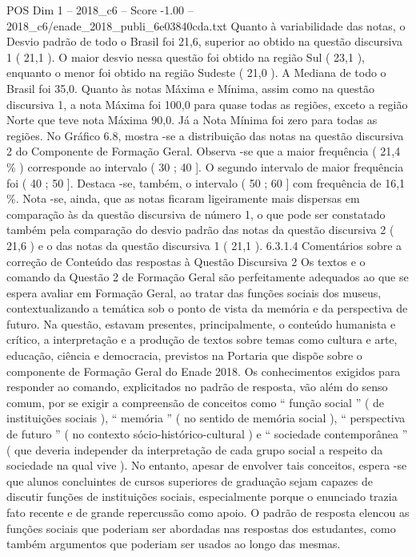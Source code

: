 \begin{textsample}{POS Dim 1 – 2018\_c6 – Score -1.00 – 2018\_c6/enade\_2018\_publi\_6e03840cda.txt}
Quanto à variabilidade das notas, o Desvio padrão de todo o Brasil foi 21,6, superior ao obtido na questão discursiva 1 ( 21,1 ).
O maior desvio nessa questão foi obtido na região Sul ( 23,1 ), enquanto o menor foi obtido na região Sudeste ( 21,0 ).
A Mediana de todo o Brasil foi 35,0.
Quanto às notas Máxima e Mínima, assim como na questão discursiva 1, a nota Máxima foi 100,0 para quase todas as regiões, exceto a região Norte que teve nota Máxima 90,0.
Já a Nota Mínima foi zero para todas as regiões.
No Gráfico 6.8, mostra -se a distribuição das notas na questão discursiva 2 do Componente de Formação Geral.
Observa -se que a maior frequência ( 21,4 \% ) corresponde ao intervalo ( 30 ; 40 ].
O segundo intervalo de maior frequência foi ( 40 ; 50 ].
Destaca -se, também, o intervalo ( 50 ; 60 ] com frequência de 16,1 \%.
Nota -se, ainda, que as notas ficaram ligeiramente mais dispersas em comparação às da questão discursiva de número 1, o que pode ser constatado também pela comparação do desvio padrão das notas da questão discursiva 2 ( 21,6 ) e o das notas da questão discursiva 1 ( 21,1 ). 6.3.1.4 Comentários sobre a correção de Conteúdo das respostas à Questão Discursiva 2 Os textos e o comando da Questão 2 de Formação Geral são perfeitamente adequados ao que se espera avaliar em Formação Geral, ao tratar das funções sociais dos museus, contextualizando a temática sob o ponto de vista da memória e da perspectiva de futuro.
Na questão, estavam presentes, principalmente, o conteúdo humanista e crítico, a interpretação e a produção de textos sobre temas como cultura e arte, educação, ciência e democracia, previstos na Portaria que dispõe sobre o componente de Formação Geral do Enade 2018.
Os conhecimentos exigidos para responder ao comando, explicitados no padrão de resposta, vão além do senso comum, por se exigir a compreensão de conceitos como “ função social ” ( de instituições sociais ), “ memória ” ( no sentido de memória social ), “ perspectiva de futuro ” ( no contexto sócio-histórico-cultural ) e “ sociedade contemporânea ” ( que deveria independer da interpretação de cada grupo social a respeito da sociedade na qual vive ).
No entanto, apesar de envolver tais conceitos, espera -se que alunos concluintes de cursos superiores de graduação sejam capazes de discutir funções de instituições sociais, especialmente porque o enunciado trazia fato recente e de grande repercussão como apoio.
O padrão de resposta elencou as funções sociais que poderiam ser abordadas nas respostas dos estudantes, como também argumentos que poderiam ser usados ao longo das mesmas.

\end{textsample}
